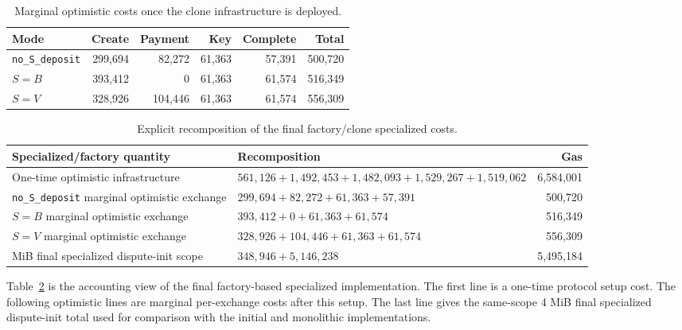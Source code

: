 \begin{table}[htbp]
  \centering
  \small
  \begin{tabularx}{\linewidth}{>{\raggedright\arraybackslash}Xrrrrr}
    \toprule
    Mode & Create & Payment & Key & Complete & Total \\
    \midrule
    \texttt{no\_S\_deposit} & 299,694 & 82,272 & 61,363 & 57,391 & 500,720 \\
    \(S=B\) & 393,412 & 0 & 61,363 & 61,574 & 516,349 \\
    \(S=V\) & 328,926 & 104,446 & 61,363 & 61,574 & 556,309 \\
    \bottomrule
\end{tabularx}
  \caption{Marginal optimistic costs once the clone infrastructure is deployed.}
  \label{tab:app-clone-marginal}
\end{table}

\begin{table}[htbp]
  \centering
  \small
  \begin{tabularx}{\linewidth}{>{\raggedright\arraybackslash}X>{\raggedright\arraybackslash}Xr}
    \toprule
    Specialized/factory quantity & Recomposition & Gas \\
    \midrule
    One-time optimistic infrastructure &
    \(561,126 + 1,492,453 + 1,482,093 + 1,529,267 + 1,519,062\) &
    6,584,001 \\
    \texttt{no\_S\_deposit} marginal optimistic exchange &
    \(299,694 + 82,272 + 61,363 + 57,391\) &
    500,720 \\
    \(S=B\) marginal optimistic exchange &
    \(393,412 + 0 + 61,363 + 61,574\) &
    516,349 \\
    \(S=V\) marginal optimistic exchange &
    \(328,926 + 104,446 + 61,363 + 61,574\) &
    556,309 \\
    4 MiB final specialized dispute-init scope &
    \(348,946 + 5,146,238\) &
    5,495,184 \\
    \bottomrule
  \end{tabularx}
  \caption{Explicit recomposition of the final factory/clone specialized costs.}
  \label{tab:app-factory-recomposition}
\end{table}

Table~\ref{tab:app-factory-recomposition} is the accounting view of the final
factory-based specialized implementation. The first line is a one-time protocol setup
cost. The following optimistic lines are marginal per-exchange costs after this setup.
The last line gives the same-scope 4 MiB final specialized dispute-init total used for
comparison with the initial and monolithic implementations.

